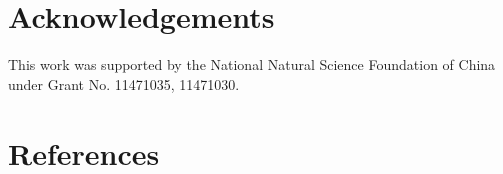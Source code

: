 \documentclass[review]{elsarticle}
\theoremstyle{plain}
\theoremstyle{definition}
\theoremstyle{remark}
\begin{document}

\section*{Acknowledgements}
This work was supported by the National Natural Science Foundation of China under Grant No. 11471035, 11471030.


\section*{References}


\end{document}

